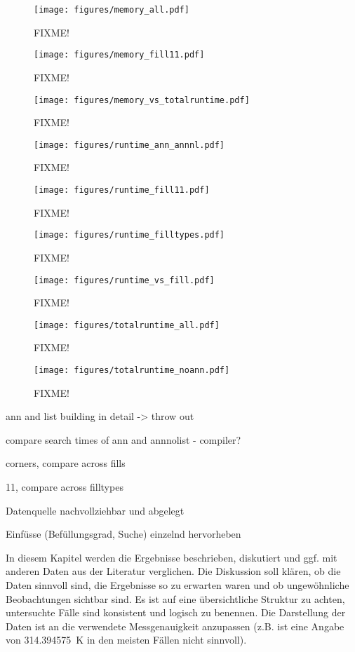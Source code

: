 \begin{figure}[h]
	\centering
	\texttt{[image: figures/memory\_all.pdf]}
	\caption{FIXME!}
\end{figure}
\begin{figure}[h]
	\centering
	\texttt{[image: figures/memory\_fill11.pdf]}
	\caption{FIXME!}
\end{figure}
\begin{figure}[h]
	\centering
	\texttt{[image: figures/memory\_vs\_totalruntime.pdf]}
	\caption{FIXME!}
\end{figure}
\begin{figure}[h]
	\centering
	\texttt{[image: figures/runtime\_ann\_annnl.pdf]}
	\caption{FIXME!}
\end{figure}
\begin{figure}[h]
	\centering
	\texttt{[image: figures/runtime\_fill11.pdf]}
	\caption{FIXME!}
\end{figure}

\begin{figure}[h]
	\centering
	\texttt{[image: figures/runtime\_filltypes.pdf]}
	\caption{FIXME!}
\end{figure}

\begin{figure}[h]
	\centering
	\texttt{[image: figures/runtime\_vs\_fill.pdf]}
	\caption{FIXME!}
\end{figure}
\begin{figure}[h]
	\centering
	\texttt{[image: figures/totalruntime\_all.pdf]}
	\caption{FIXME!}
\end{figure}
\begin{figure}[h]
	\centering
	\texttt{[image: figures/totalruntime\_noann.pdf]}
	\caption{FIXME!}
\end{figure}



ann and list building in detail -> throw out

compare search times of ann and annnolist - compiler?

corners, compare across fills

11, compare across filltypes


Datenquelle nachvollziehbar und abgelegt

Einfüsse (Befüllungsgrad, Suche) einzelnd hervorheben


In diesem Kapitel werden die Ergebnisse beschrieben, diskutiert und ggf. mit anderen Daten aus der Literatur verglichen. Die Diskussion soll klären, ob die Daten sinnvoll sind, die Ergebnisse so zu erwarten waren und ob ungewöhnliche Beobachtungen sichtbar sind. Es ist auf eine übersichtliche Struktur zu achten, untersuchte Fälle sind konsistent und logisch zu benennen. Die Darstellung der Daten ist an die verwendete Messgenauigkeit anzupassen (z.B. ist eine Angabe von \SI{314.394575}{K} in den meisten Fällen nicht sinnvoll).
 
